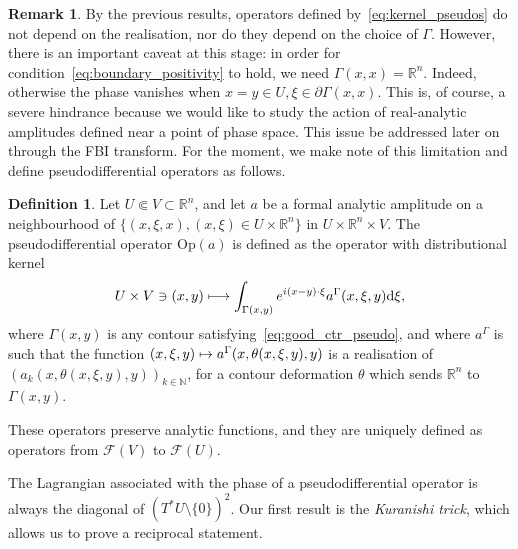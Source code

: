 \documentclass[10pt]{amsart}
\theoremstyle{definition}\newtheorem{defi}[theo]{Definition}\newtheorem{rema}[theo]{Remark}\newtheorem{exam}[theo]{Example}\newtheorem{exem}[theo]{Example}\newtheorem{nota}[theo]{Notation}
\newcommand{\Opp}{\mathrm{Op}}
\newcommand{\clF}{\mathcal{F}}
\newcommand\1{\mathds{1}}
\newcommand{\R}{\mathbb{R}}
\newcommand{\N}{\mathbb{N}}
\newcommand{\dd}{\mathrm{d}}
\let\oldmapsto\mapsto
\renewcommand*{\mapsto}{\mathchoice{\longmapsto}{\oldmapsto}{\oldmapsto}{\oldmapsto}}
\begin{document}
\begin{rema}\label{rem:pseudo_not_microlocal}
By the previous results, operators defined by~\eqref{eq:kernel_pseudos} do not depend on the realisation, nor do they depend on the choice of $\Gamma$. However, there is an important caveat at this stage: in order for condition~\eqref{eq:boundary_positivity} to hold, we need ${\Gamma(x,x)=\R^n}$. Indeed, otherwise the phase vanishes when $x=y\in U,\xi\in \partial \Gamma(x,x)$. This is, of course, a severe hindrance because we would like to study the action of real-analytic amplitudes defined near a point of phase space. This issue be addressed later on through the FBI transform. For the moment, we make note of this limitation and define pseudodifferential operators as follows.
\end{rema}

\begin{defi}\label{def:pseudos}
Let $U\Subset V\subset \R^n$, and let $a$ be a formal analytic amplitude on a neighbourhood of $\{(x,\xi,x),(x,\xi)\in U\times \R^n\}$ in $U\times \R^n\times V$. The pseudodifferential operator $\Opp(a)$ is defined as the operator with distributional kernel
\[
U\times V\ni (x,y)\mapsto
\int_{\Gamma(x,y)} e^{i(x-y)\cdot\xi}a^{\Gamma}(x,\xi,y)\dd \xi,
\]
where $\Gamma(x,y)$ is any contour satisfying~\eqref{eq:good_ctr_pseudo}, and where $a^{\Gamma}$ is such that the function $(x,\xi,y)\mapsto a^{\Gamma}(x,\theta(x,\xi,y),y)$ is a realisation of $(a_k(x,\theta(x,\xi,y),y))_{k\in \N}$, for a contour deformation $\theta$ which sends $\R^n$ to $\Gamma(x,y)$.

These operators preserve analytic functions, and they are uniquely defined as operators from $\clF(V)$ to $\clF(U)$.
\end{defi}

The Lagrangian associated with the phase of a pseudodifferential operator is always the diagonal of $(T^*U\setminus \{0\})^2$. Our first result is the \emph{Kuranishi trick}, which allows us to prove a reciprocal statement.
\end{document}
